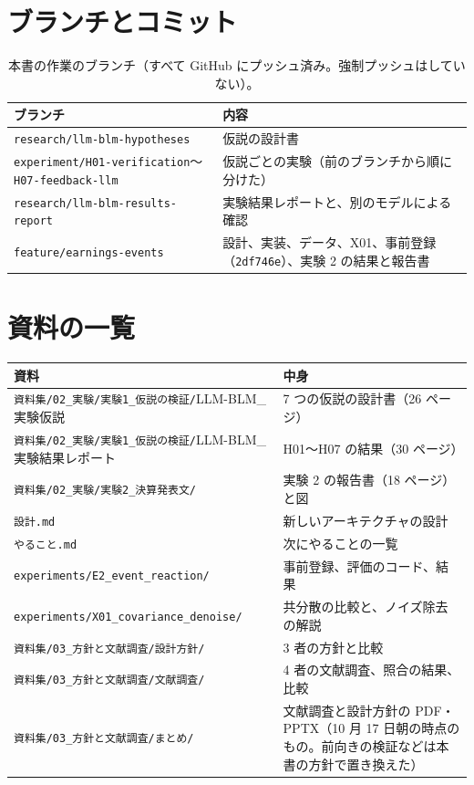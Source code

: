 \documentclass[xelatex,ja=standard,jafont=haranoaji,a4paper,10pt]{bxjsreport}
\newcommand{\code}[1]{\texttt{#1}}
\begin{document}
\appendix

\chapter{ブランチとコミット}\label{app:git}

\begin{table}[H]
\centering
\caption{本書の作業のブランチ（すべて GitHub にプッシュ済み。強制プッシュはしていない）。}
\small
\begin{tabular}{p{5.6cm}p{8.4cm}}
\toprule
ブランチ & 内容 \\
\midrule
\code{research/llm-blm-hypotheses} & 仮説の設計書 \\
\code{experiment/H01-verification}〜\code{H07-feedback-llm} & 仮説ごとの実験（前のブランチから順に分けた） \\
\code{research/llm-blm-results-report} & 実験結果レポートと、別のモデルによる確認 \\
\code{feature/earnings-events} & 設計、実装、データ、X01、事前登録（\code{2df746e}）、実験 2 の結果と報告書 \\
\bottomrule
\end{tabular}
\end{table}

\chapter{資料の一覧}\label{app:docs}

\begin{longtable}{p{6.4cm}p{7.6cm}}
\toprule
\textbf{資料} & \textbf{中身} \\
\midrule
\endfirsthead
\bottomrule
\endfoot
\code{資料集/02\_実験/実験1\_仮説の検証/}\newline LLM-BLM\_実験仮説 & 7 つの仮説の設計書（26 ページ） \\
\code{資料集/02\_実験/実験1\_仮説の検証/}\newline LLM-BLM\_実験結果レポート & H01〜H07 の結果（30 ページ） \\
\code{資料集/02\_実験/実験2\_決算発表文/} & 実験 2 の報告書（18 ページ）と図 \\
\code{設計.md} & 新しいアーキテクチャの設計 \\
\code{やること.md} & 次にやることの一覧 \\
\code{experiments/E2\_event\_reaction/} & 事前登録、評価のコード、結果 \\
\code{experiments/X01\_covariance\_}\newline\code{denoise/} & 共分散の比較と、ノイズ除去の解説 \\
\code{資料集/03\_方針と文献調査/設計方針/} & 3 者の方針と比較 \\
\code{資料集/03\_方針と文献調査/文献調査/} & 4 者の文献調査、照合の結果、比較 \\
\code{資料集/03\_方針と文献調査/まとめ/} & 文献調査と設計方針の PDF・PPTX（10 月 17 日朝の時点のもの。前向きの検証などは本書の方針で置き換えた） \\
\end{longtable}
\end{document}

